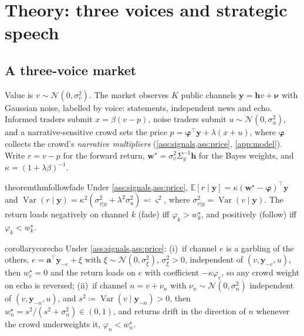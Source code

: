 \documentclass{article}
\theoremstyle{plain}
\theoremstyle{definition}
\theoremstyle{remark}
\newcommand{\E}{\mathbb{E}}
\newcommand{\N}{\mathcal{N}}
\newcommand{\w}{\bm{w}}
\newcommand{\y}{\bm{y}}
\newcommand{\h}{\bm{h}}
\newcommand{\bphi}{\bm{\varphi}}
\DeclareMathOperator{\Var}{Var}
\begin{document}
\section{Theory: three voices and strategic speech}\label{sec:theory}

\subsection{A three-voice market}\label{sec:model}

Value is $v\sim\N(0,\sigma_v^2)$. The market observes $K$ public channels $\y=\h v+\bm\nu$ with Gaussian noise, labelled by voice: statements, independent news and echo. Informed traders submit $x=\beta(v-p)$, noise traders submit $u\sim\N(0,\sigma_u^2)$, and a narrative-sensitive crowd sets the price $p=\bphi^\top\y+\lambda(x+u)$, where $\bphi$ collects the crowd's \emph{narrative multipliers} (\cref{ass:signals,ass:price}, \cref{app:model}). Write $r=v-p$ for the forward return, $\w^\star=\sigma_v^2\Sigma_y^{-1}\h$ for the Bayes weights, and $\kappa=(1+\lambda\beta)^{-1}$.

\begin{restatable}{theorem}{thmfollowfade}\label{thm:followfade}
Under \cref{ass:signals,ass:price}, $\E[r\mid\y]=\kappa(\w^\star-\bphi)^\top\y$ and $\Var(r\mid\y)=\kappa^2(\sigma^2_{v|y}+\lambda^2\sigma_u^2)\eqqcolon\varsigma^2$, where $\sigma^2_{v|y}=\Var(v\mid\y)$. The return loads negatively on channel $k$ (fade) iff $\varphi_k>w^\star_k$, and positively (follow) iff $\varphi_k<w^\star_k$.
\end{restatable}

\begin{restatable}{corollary}{corecho}\label{cor:echo}\label{cor:news}
Under \cref{ass:signals,ass:price}: (i)~if channel $e$ is a garbling of the others, $e=\bm a^\top\y_{-e}+\xi$ with $\xi\sim\N(0,\sigma_\xi^2)$, $\sigma_\xi^2>0$, independent of $(v,\y_{-e},u)$, then $w^\star_e=0$ and the return loads on $e$ with coefficient $-\kappa\varphi_e$, so any crowd weight on echo is reversed; (ii)~if channel $n=v+\nu_n$ with $\nu_n\sim\N(0,\sigma_n^2)$ independent of $(v,\y_{-n},u)$, and $s^2\coloneqq\Var(v\mid\y_{-n})>0$, then $w^\star_n=s^2/(s^2+\sigma_n^2)\in(0,1)$, and returns drift in the direction of $n$ whenever the crowd underweights it, $\varphi_n<w^\star_n$.
\end{restatable}
\end{document}
